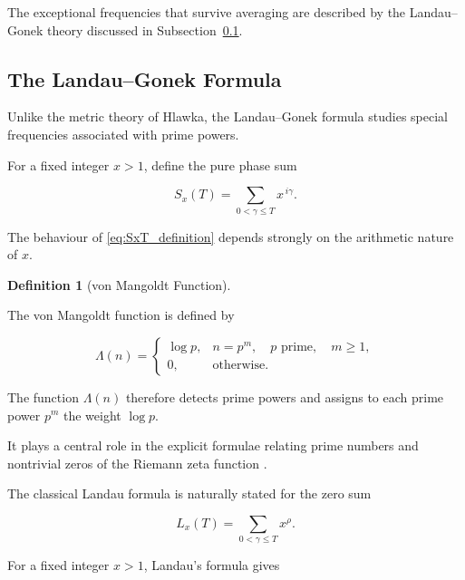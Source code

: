 \documentclass[11pt]{amsart}
\numberwithin{equation}{section}
\theoremstyle{plain}
\theoremstyle{definition}
\newtheorem{definition}[theorem]{Definition}
\theoremstyle{remark}
\begin{document}
The exceptional frequencies that survive averaging are described by the
Landau--Gonek theory discussed in Subsection~\ref{sec:prime_power_frequencies}.

\subsection{The Landau--Gonek Formula}
\label{sec:prime_power_frequencies}

Unlike the metric theory of Hlawka,
the Landau--Gonek formula studies special frequencies associated with
prime powers.

For a fixed integer \(x>1\), define the pure phase sum

\begin{equation}
S_x(T)
=
\sum_{0<\gamma\le T}
x^{\,i\gamma}.
\label{eq:SxT_definition}
\end{equation}

The behaviour of \eqref{eq:SxT_definition} depends strongly on the
arithmetic nature of \(x\).

\begin{definition}[von Mangoldt Function]
\label{def:von_mangoldt_function}

The von Mangoldt function is defined by

\begin{equation}
\Lambda(n)
=
\begin{cases}
\log p,
&
n=p^{m},
\quad p \text{ prime},
\quad m\ge 1,
\\[1ex]
0,
&
\text{otherwise}.
\end{cases}
\label{eq:von_mangoldt}
\end{equation}

\end{definition}

The function \(\Lambda(n)\) therefore detects prime powers and assigns
to each prime power \(p^m\) the weight \(\log p\).

It plays a central role in the explicit formulae relating prime numbers
and nontrivial zeros of the Riemann zeta function
\cite{Landau1911,Titchmarsh1986,IwaniecKowalski2004}.

The classical Landau formula is naturally stated for the zero sum

\begin{equation}
L_x(T)
=
\sum_{0<\gamma\le T}
x^\rho.
\label{eq:landau_zero_sum}
\end{equation}

For a fixed integer \(x>1\), Landau's formula gives
\end{document}
